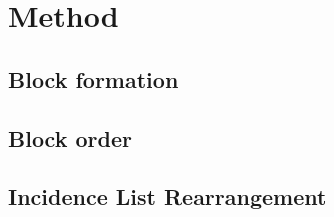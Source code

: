\chapter{Method}\label{\positionnumber}
    \section{Block formation}
    
    \section{Block order}\label{\positionnumber}
    
    \section{Incidence List Rearrangement}\label{\positionnumber}
